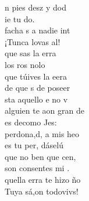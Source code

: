 \documentclass[12pt]{article}
\begin{document}
\begin{multicols*}{2}
\begin{cancion}%
	n pies desz y dod\\
	ie  tu do.\\
	 facha s a nadie int\\
	¡Tunca lovas al!\\
\jump
	que sas  la erra\\
	los ros nolo   \\
	que túives la eera\\
	de que s de poseer\\
	sta aquello e no v\\
\jump
	 alguien te aon gran de\\
	es decomo Jes:\\
	perdona,d, a mis heo\\
	es tu per, dáselú\\
\jump
	que no ben que cen,\\
	son consentes mi .\\
	quella erra  te hizo ño\\
	Tuya sá,on todovivs! \\
\end{cancion}%


\end{multicols*}
\end{document}
